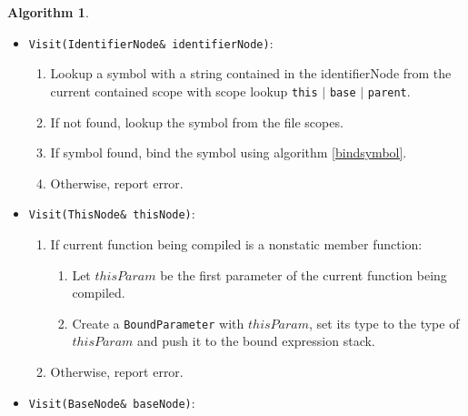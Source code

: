 \documentclass[a4paper,oneside,11pt]{book}
\theoremstyle{definition}
\newtheorem{algo}{Algorithm}[section]
\begin{document}
\begin{algo}
\begin{itemize}
\begin{enumerate}
\begin{enumerate}
\begin{enumerate}
Let $m$ be the number of template arguments of templateIdNode.
\item
If $m < n$, resolve the default template arguments using algorithm \ref{resolvedefaulttypearguments}, giving it $typeArguments$, $subjectClassType$,
current container scope and file scopes.
\item
Call algorithm \ref{maketemplatetype} to make a class template specialization with $subjectClassType$ and $typeArguments$. Let $type$ be the type returned.
\item
Create a \verb|BoundTypeExpression| with $type$, and push it to the bound expression stack.
\end{enumerate}
\item
Otherwise, report error.
\end{enumerate}
\item
Otherwise, report error.
\end{enumerate}
\item
\verb|Visit(IdentifierNode& identifierNode)|:\\
\begin{enumerate}
\item
Lookup a symbol with a string contained in the identifierNode from the current contained scope with scope lookup \verb|this| $|$ \verb|base| $|$ \verb|parent|.
\item
If not found, lookup the symbol from the file scopes.
\item
If symbol found, bind the symbol using algorithm \ref{bindsymbol}.
\item
Otherwise, report error.
\end{enumerate}
\item
\verb|Visit(ThisNode& thisNode)|:\\
\begin{enumerate}
\item
If current function being compiled is a nonstatic member function:
\begin{enumerate}
\item
Let $thisParam$ be the first parameter of the current function being compiled.
\item
Create a \verb|BoundParameter| with $thisParam$, set its type to the type of $thisParam$ and push it to the bound expression stack.
\end{enumerate}
\item
Otherwise, report error.
\end{enumerate}
\item
\verb|Visit(BaseNode& baseNode)|:\\

\end{itemize}
\end{algo}
\end{document}
